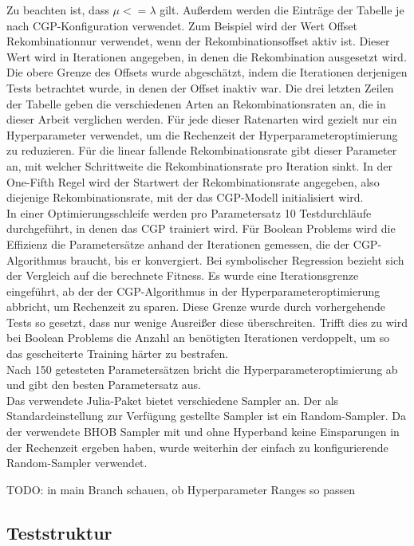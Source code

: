 Zu beachten ist, dass $\mu <= \lambda$ gilt.
Außerdem werden die Einträge der Tabelle je nach CGP-Konfiguration verwendet.
Zum Beispiel wird der Wert \glqq Offset Rekombination\grqq\space nur verwendet, wenn der Rekombinationsoffset aktiv ist. 
Dieser Wert wird in Iterationen angegeben, in denen die Rekombination ausgesetzt wird.
Die obere Grenze des Offsets wurde abgeschätzt, indem die Iterationen derjenigen Tests betrachtet wurde, in denen der Offset inaktiv war.
Die drei letzten Zeilen der Tabelle geben die verschiedenen Arten an Rekombinationsraten an, die in dieser Arbeit verglichen werden.
Für jede dieser Ratenarten wird gezielt nur ein Hyperparameter verwendet, um die Rechenzeit der Hyperparameteroptimierung zu reduzieren.
Für die linear fallende Rekombinationsrate gibt dieser Parameter an, mit welcher Schrittweite die Rekombinationsrate pro Iteration sinkt.
In der One-Fifth Regel wird der Startwert der Rekombinationsrate angegeben, also diejenige Rekombinationsrate, mit der das CGP-Modell initialisiert wird.\\

In einer Optimierungsschleife werden pro Parametersatz 10 Testdurchläufe durchgeführt, in denen das CGP trainiert wird.
Für Boolean Problems wird die Effizienz die Parametersätze anhand der Iterationen gemessen, die der CGP-Algorithmus braucht, bis er konvergiert.
Bei symbolischer Regression bezieht sich der Vergleich auf die berechnete Fitness.
Es wurde eine Iterationsgrenze eingeführt, ab der der CGP-Algorithmus in der Hyperparameteroptimierung abbricht, um Rechenzeit zu sparen.
Diese Grenze wurde durch vorhergehende Tests so gesetzt, dass nur wenige Ausreißer diese überschreiten.
Trifft dies zu wird bei Boolean Problems die Anzahl an benötigten Iterationen verdoppelt, um so das gescheiterte Training härter zu bestrafen.\\
Nach 150 getesteten Parametersätzen bricht die Hyperparameteroptimierung ab und gibt den besten Parametersatz aus.\\

Das verwendete Julia-Paket bietet verschiedene Sampler an.
Der als Standardeinstellung zur Verfügung gestellte Sampler ist ein Random-Sampler.
Da der verwendete BHOB Sampler mit und ohne Hyperband keine Einsparungen in der Rechenzeit ergeben haben, wurde weiterhin der einfach zu konfigurierende Random-Sampler verwendet. 

TODO: in main Branch schauen, ob Hyperparameter Ranges so passen

\subsection{Teststruktur}
\label{subsec:struktur}

